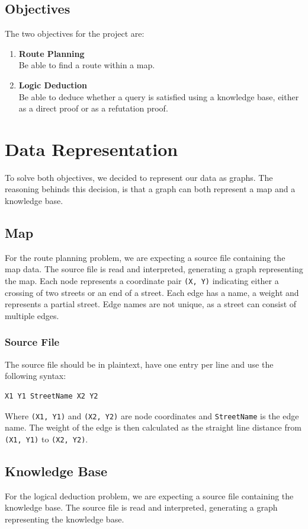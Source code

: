 \documentclass[11pt]{article}
\begin{document}
\subsection{Objectives}
The two objectives for the project are:
\begin{enumerate}
	\item[] \textbf{Route Planning}\\
	Be able to find a route within a map.
	
	\item[] \textbf{Logic Deduction}\\
	Be able to deduce whether a query is satisfied using a knowledge base, either as a direct proof or as a refutation proof. 
\end{enumerate}

\section{Data Representation}
To solve both objectives, we decided to represent our data as graphs. The reasoning behinds this decision, is that a graph can both represent a map and a knowledge base.

\subsection{Map}
For the route planning problem, we are expecting a source file containing the map data. The source file is read and interpreted, generating a graph representing the map. Each node represents a coordinate pair {\tt (X, Y)} indicating either a crossing of two streets or an end of a street. Each edge has a name, a weight and represents a partial street. Edge names are not unique, as a street can consist of multiple edges.

\subsubsection{Source File}
The source file should be in plaintext, have one entry per line and use the following syntax:
\begin{lstlisting}[style=logoutput]
X1 Y1 StreetName X2 Y2
\end{lstlisting}

Where {\tt (X1, Y1)} and {\tt (X2, Y2)} are node coordinates and {\tt StreetName} is the edge name. The weight of the edge is then calculated as the straight line distance from {\tt (X1, Y1)} to {\tt (X2, Y2)}.

\subsection{Knowledge Base}
For the logical deduction problem, we are expecting a source file containing the knowledge base. The source file is read and interpreted, generating a graph representing the knowledge base.
\end{document}
